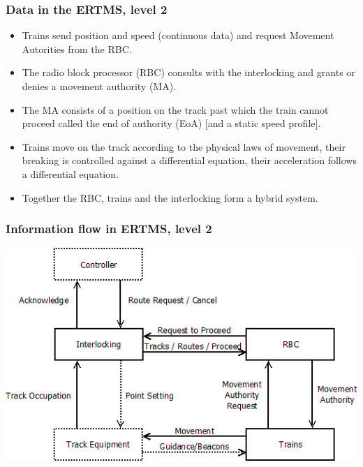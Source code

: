 \documentclass{beamer}
\begin{document}
\begin{frame}
\frametitle{Data in the ERTMS, level 2}
\begin{itemize}
\item Trains send position and speed (continuous data) and request \alert{Movement Autorities} from the RBC.

 
\item The radio block processor (RBC) consults with the interlocking and
grants or denies  a \alert{movement
  authority} (MA).

\medskip

\item The MA consists of a position on the track past which the train cannot
proceed called the end of authority (EoA) [and a static speed profile].

\medskip

\item Trains move on the track according to the physical laws of movement,
their breaking is controlled against a differential equation, their
acceleration follows a differential equation.

\medskip

\item Together the RBC, trains and the interlocking form a \alert{hybrid
  system}.
 \end{itemize}
\end{frame}


\begin{frame}
\frametitle{Information flow in ERTMS, level 2}
\begin{center}
\includegraphics[scale=0.5]{wadtsiemens.png}
\end{center}
\end{frame}
\end{document}

